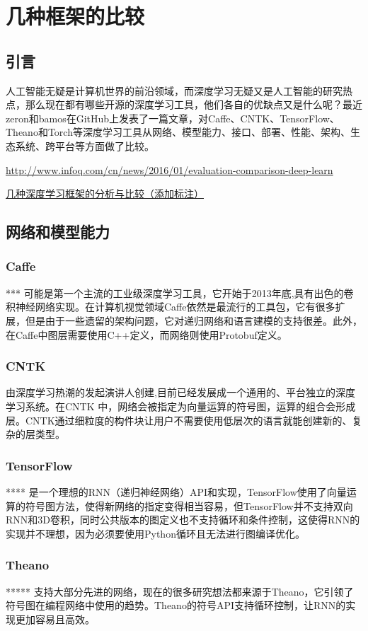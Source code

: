 \chapter{几种框架的比较}
\section{引言}
人工智能无疑是计算机世界的前沿领域，而深度学习无疑又是人工智能的研究热点，那么现在都有哪些开源的深度学习工具，他们各自的优缺点又是什么呢？最近zeron和bamos在GitHub上发表了一篇文章，对Caffe、CNTK、TensorFlow、Theano和Torch等深度学习工具从网络、模型能力、接口、部署、性能、架构、生态系统、跨平台等方面做了比较。

\url{http://www.infoq.com/cn/news/2016/01/evaluation-comparison-deep-learn}%

\href{http://blog.csdn.net/liccv/article/details/52526506}{几种深度学习框架的分析与比较（添加标注）}%


\section{网络和模型能力}
\subsection{Caffe}
***
可能是第一个主流的工业级深度学习工具，它开始于2013年底,具有出色的卷积神经网络实现。在计算机视觉领域Caffe依然是最流行的工具包，它有很多扩展，但是由于一些遗留的架构问题，它对递归网络和语言建模的支持很差。此外，在Caffe中图层需要使用C++定义，而网络则使用Protobuf定义。

\subsection{CNTK}
由深度学习热潮的发起演讲人创建,目前已经发展成一个通用的、平台独立的深度学习系统。在CNTK 中，网络会被指定为向量运算的符号图，运算的组合会形成层。CNTK通过细粒度的构件块让用户不需要使用低层次的语言就能创建新的、复杂的层类型。

\subsection{TensorFlow}
****
是一个理想的RNN（递归神经网络）API和实现，TensorFlow使用了向量运算的符号图方法，使得新网络的指定变得相当容易，但TensorFlow并不支持双向RNN和3D卷积，同时公共版本的图定义也不支持循环和条件控制，这使得RNN的实现并不理想，因为必须要使用Python循环且无法进行图编译优化。

\subsection{Theano}
*****
支持大部分先进的网络，现在的很多研究想法都来源于Theano，它引领了符号图在编程网络中使用的趋势。Theano的符号API支持循环控制，让RNN的实现更加容易且高效。

